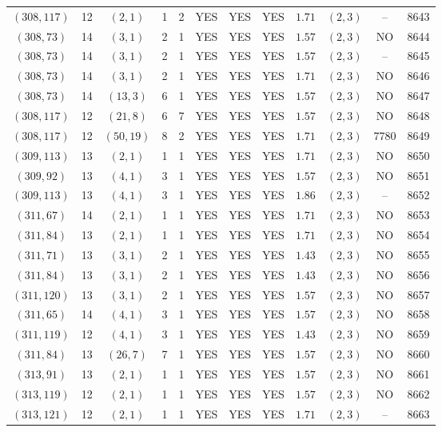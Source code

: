 \begin{longtable}{|c|c|c|c|c|c|c|c|c|c|c|c|}
$(308,117)$ & 12 & $(2,1)$ & 1 & 2 & YES & YES & YES & $1.71$ & $(2,3)$ & -- & 8643\\
$(308,73)$ & 14 & $(3,1)$ & 2 & 1 & YES & YES & YES & $1.57$ & $(2,3)$ & NO & 8644\\
$(308,73)$ & 14 & $(3,1)$ & 2 & 1 & YES & YES & YES & $1.57$ & $(2,3)$ & -- & 8645\\
$(308,73)$ & 14 & $(3,1)$ & 2 & 1 & YES & YES & YES & $1.71$ & $(2,3)$ & NO & 8646\\
$(308,73)$ & 14 & $(13,3)$ & 6 & 1 & YES & YES & YES & $1.57$ & $(2,3)$ & NO & 8647\\
$(308,117)$ & 12 & $(21,8)$ & 6 & 7 & YES & YES & YES & $1.57$ & $(2,3)$ & NO & 8648\\
$(308,117)$ & 12 & $(50,19)$ & 8 & 2 & YES & YES & YES & $1.71$ & $(2,3)$ & 7780 & 8649\\
$(309,113)$ & 13 & $(2,1)$ & 1 & 1 & YES & YES & YES & $1.71$ & $(2,3)$ & NO & 8650\\
$(309,92)$ & 13 & $(4,1)$ & 3 & 1 & YES & YES & YES & $1.57$ & $(2,3)$ & NO & 8651\\
$(309,113)$ & 13 & $(4,1)$ & 3 & 1 & YES & YES & YES & $1.86$ & $(2,3)$ & -- & 8652\\
$(311,67)$ & 14 & $(2,1)$ & 1 & 1 & YES & YES & YES & $1.71$ & $(2,3)$ & NO & 8653\\
$(311,84)$ & 13 & $(2,1)$ & 1 & 1 & YES & YES & YES & $1.71$ & $(2,3)$ & NO & 8654\\
$(311,71)$ & 13 & $(3,1)$ & 2 & 1 & YES & YES & YES & $1.43$ & $(2,3)$ & NO & 8655\\
$(311,84)$ & 13 & $(3,1)$ & 2 & 1 & YES & YES & YES & $1.43$ & $(2,3)$ & NO & 8656\\
$(311,120)$ & 13 & $(3,1)$ & 2 & 1 & YES & YES & YES & $1.57$ & $(2,3)$ & NO & 8657\\
$(311,65)$ & 14 & $(4,1)$ & 3 & 1 & YES & YES & YES & $1.57$ & $(2,3)$ & NO & 8658\\
$(311,119)$ & 12 & $(4,1)$ & 3 & 1 & YES & YES & YES & $1.43$ & $(2,3)$ & NO & 8659\\
$(311,84)$ & 13 & $(26,7)$ & 7 & 1 & YES & YES & YES & $1.57$ & $(2,3)$ & NO & 8660\\
$(313,91)$ & 13 & $(2,1)$ & 1 & 1 & YES & YES & YES & $1.57$ & $(2,3)$ & NO & 8661\\
$(313,119)$ & 12 & $(2,1)$ & 1 & 1 & YES & YES & YES & $1.57$ & $(2,3)$ & NO & 8662\\
$(313,121)$ & 12 & $(2,1)$ & 1 & 1 & YES & YES & YES & $1.71$ & $(2,3)$ & -- & 8663\\

\end{longtable}

